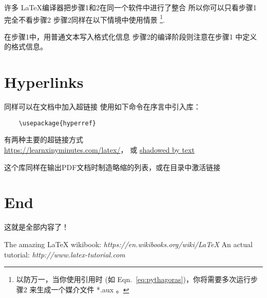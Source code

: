\documentclass[12pt]{article}
\begin{document}
许多 \LaTeX \hspace{1pt}编译器把步骤1和2在同一个软件中进行了整合
所以你可以只看步骤1完全不看步骤2
步骤2同样在以下情境中使用情景 \footnote{以防万一，当你使用引用时
 (如 Eqn.~\ref{eq:pythagoras})，你将需要多次运行步骤2
来生成一个媒介文件 *.aux 。}.

在步骤1中，用普通文本写入格式化信息
步骤2的编译阶段则注意在步骤1 中定义的格式信息。

\section{Hyperlinks}
同样可以在文档中加入超链接
使用如下命令在序言中引入库：
\begin{verbatim} 
    \usepackage{hyperref}
\end{verbatim}

有两种主要的超链接方式 \\
\url{https://learnxinyminutes.com/latex/}， 或  
\href{https://learnxinyminutes.com/latex/}{shadowed by text}

这个库同样在输出PDF文档时制造略缩的列表，或在目录中激活链接


\section{End}

这就是全部内容了！

\begin{thebibliography}{1}
   The amazing \LaTeX \hspace{1pt} wikibook: {\em 
https://en.wikibooks.org/wiki/LaTeX}
   An actual tutorial: {\em http://www.latex-tutorial.com}
\end{thebibliography}

\end{document}
